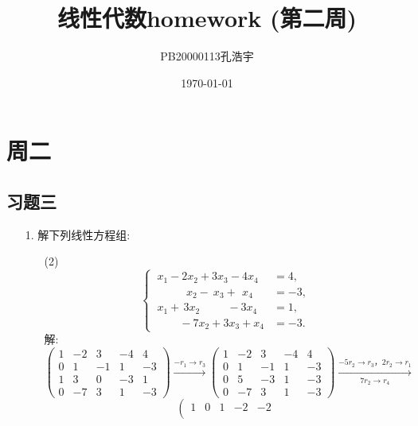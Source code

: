 \documentclass{article}
\title{线性代数homework (第二周)}
\author{PB20000113孔浩宇}
\date{\today}
\begin{document}
\maketitle
\section{周二}                             %
    \subsection{习题三}                      %
    \begin{enumerate}
        \item [1.]解下列线性方程组:
        \begin{enumerate}
            \item [(2)]
            \[
                \begin{cases}
                    \ x_1-2x_2+3x_3-4x_4&=4,\\
                    \ \qquad \  \ \, x_2-\ x_3+\ \, x_4&=-3,\\
                    \ x_1+\, 3x_2 \qquad \ \  -3x_4&=1,\\
                    \ \qquad -7x_2+3x_3+x_4&=-3.
                \end{cases}
            \]
            解:
            \[
            \left(\begin{array}{ccccc}
                1 & -2 & 3 & -4 & 4\\
                0 & 1 & -1 & 1 & -3\\
                1 & 3 & 0 & -3 & 1\\
                0 & -7 & 3 & 1 & -3 
                \end{array}
            \right)
            \xrightarrow{-r_1 \rightarrow r_3}
            \left(\begin{array}{ccccc}
                1 & -2 & 3 & -4 & 4\\
                0 & 1 & -1 & 1 & -3\\
                0 & 5 & -3 & 1 & -3\\
                0 & -7 & 3 & 1 & -3 
                \end{array}
            \right)
            \xrightarrow[7r_2\rightarrow r_4]{-5r_2 \rightarrow r_3，2r_2 \rightarrow r_1}
            \]
            \[
            \left(\begin{array}{ccccc}
                1 & 0 & 1 & -2 & -2\\

\end{array}\]
\end{enumerate}
\end{enumerate}
\end{document}
